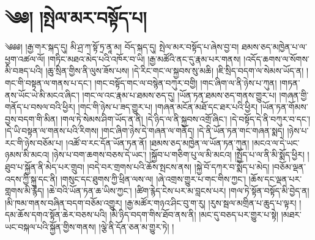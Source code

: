 \chapter{༄༅། །སྤེལ་མར་བསྟོད་པ།}༄༅༅། །རྒྱ་གར་སྐད་དུ། མི་ཤྲ་ཀ་སྟོ་ཏྲ་ནཱ་མ། བོད་སྐད་དུ། སྤེལ་མར་བསྟོད་པ་ཞེས་བྱ་བ། ཐམས་ཅད་མཁྱེན་པ་ལ་ཕྱག་འཚལ་ལོ། །གཏིང་མཐའ་མེད་པའི་འཁོར་བ་ཡི། །རྒྱ་མཚོའི་ནང་དུ་རྣམ་པར་གནས། །འདོད་ཆགས་ལ་སོགས་མི་བཟད་པའི། །ཆུ་སྲིན་གྱིས་ནི་ལུས་ཟོས་པས། །དེ་རིང་གང་ལ་སྐྱབས་སུ་མཆི། །ཇི་སྲིད་བདག་ལ་སེམས་ཡོད་ན། །གང་གི་བསྟན་ལ་གནས་པ་དང་། །གང་བསྟོད་གང་ལ་བསྙེན་བཀུར་བགྱི། །གང་ཞིག་ལ་ནི་ཉེས་པ་ཀུན། །གཏན་ནས་ཡོང་ཡེ་མི་མངའ་ཞིང་། །གང་ལ་འང་རྣམ་པ་ཐམས་ཅད་དུ། །ཡོན་ཏན་ཐམས་ཅད་གནས་གྱུར་པ། །གཞན་གྱི་གནོད་པ་བསལ་བའི་ཕྱིར། །གང་གི་ཉེས་པ་ཟད་གྱུར་པ། །གཞན་མངོན་མཐོ་དང་ཐར་པའི་ཕྱིར། །ཡོན་ཏན་གོམས་བྱས་བདག་གི་མིན། །གལ་ཏེ་སེམས་ཤིག་ཡོད་ན་ནི། །དེ་ཉིད་ལ་ནི་སྐྱབས་འགྲོ་ཞིང་། །དེ་བསྟོད་དེ་ནི་བཀུར་བ་དང་། །དེ་ཡི་བསྟན་ལ་གནས་པའི་རིགས། །གང་ཞིག་ཉེས་དེ་གཞན་ལ་གནོད། །དེ་ནི་ཡོན་ཏན་གང་གཞན་སྨད། །ཉེས་པ་རང་གི་ཉེས་བཅོམ་པ། །འཚོ་བ་རང་དོན་ཡོན་ཏན་ནོ། །ཐམས་ཅད་མཁྱེན་ལ་ཡོན་ཏན་ཀུན། །མངའ་ལ་དེ་ཡང་ཉམས་མི་མངའ། །ཉེས་པ་བག་ཆགས་བཅས་དེ་ཡང་། །སྐྱོབ་པ་གཅིག་པུ་ལ་མི་མངའ། །སྤྱོད་པ་ལ་ནི་མི་སྨོད་ཕྱིར། །ཐུབ་པ་སྐྱོན་ནི་མེད་པར་གྲུབ། །བདེ་བར་གྲགས་པའི་ཆོས་སྤངས་ནས། །སྐྱེ་བོ་དཀར་བ་སྨོད་པ་མེད། །བཅོམ་ལྡན་འདས་ཀྱི་སྐུ་དང་ནི། །གསུང་དང་ཐུགས་ཀྱི་ཕྲིན་ལས་ལ། །ཞེ་འགྲས་གྱུར་པ་གང་གིས་ཀྱང་། །ཆོས་དང་ལྡན་པར་གླགས་མི་རྙེད། །ཆེ་བའི་ཡོན་ཏན་ཆ་ཡིས་ཀྱང་། །ཚིག་རྙེད་ངེས་པར་མ་བླངས་པར། །གལ་ཏེ་སྟོན་བསྟོད་མི་བྱེད་ན། །མི་ཁམ་གནས་བཞིན་བདག་བཅོམ་འགྱུར། །རྒྱ་མཚོར་གཉའ་ཤིང་བུ་ག་རུ། །རུས་སྦལ་མགྲིན་པ་ཆུད་པ་ལྟར། །དམ་ཆོས་དགའ་སྟོན་ཆེར་བཅས་པའི། །མི་ཉིད་བདག་གིས་ཐོབ་ནས་ནི། །མང་དུ་བཅད་པར་གྱུར་པ་སྟེ། །མཐར་ཡང་བསྐལ་པའི་སྐྱོན་གྱིས་གནས། །ལྕེ་ནི་དོན་ཅན་མ་གྱུར་ཏེ། །
